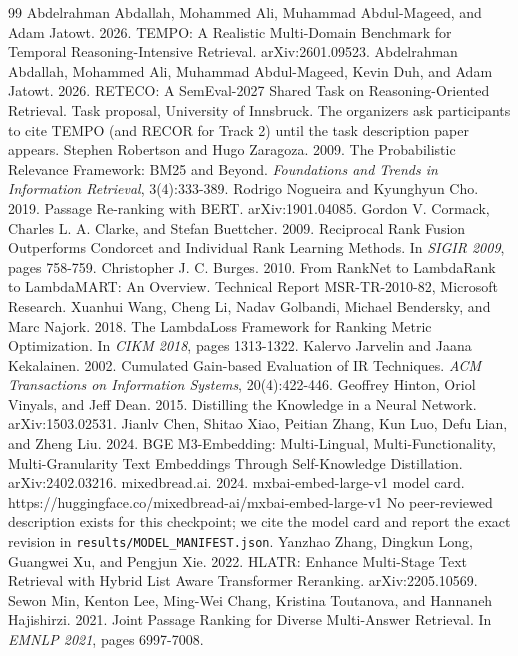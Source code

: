 \documentclass[11pt]{article}
\begin{document}
\begin{thebibliography}{99}
\small
{} Abdelrahman Abdallah, Mohammed Ali, Muhammad Abdul-Mageed, and Adam Jatowt. 2026. TEMPO: A Realistic Multi-Domain Benchmark for Temporal Reasoning-Intensive Retrieval. arXiv:2601.09523.
 Abdelrahman Abdallah, Mohammed Ali, Muhammad Abdul-Mageed, Kevin Duh, and Adam Jatowt. 2026. RETECO: A SemEval-2027 Shared Task on Reasoning-Oriented Retrieval. Task proposal, University of Innsbruck. The organizers ask participants to cite TEMPO (and RECOR for Track 2) until the task description paper appears.
 Stephen Robertson and Hugo Zaragoza. 2009. The Probabilistic Relevance Framework: BM25 and Beyond. \emph{Foundations and Trends in Information Retrieval}, 3(4):333-389.
 Rodrigo Nogueira and Kyunghyun Cho. 2019. Passage Re-ranking with BERT. arXiv:1901.04085.
 Gordon V. Cormack, Charles L. A. Clarke, and Stefan Buettcher. 2009. Reciprocal Rank Fusion Outperforms Condorcet and Individual Rank Learning Methods. In \emph{SIGIR 2009}, pages 758-759.
 Christopher J. C. Burges. 2010. From RankNet to LambdaRank to LambdaMART: An Overview. Technical Report MSR-TR-2010-82, Microsoft Research.
 Xuanhui Wang, Cheng Li, Nadav Golbandi, Michael Bendersky, and Marc Najork. 2018. The LambdaLoss Framework for Ranking Metric Optimization. In \emph{CIKM 2018}, pages 1313-1322.
 Kalervo Jarvelin and Jaana Kekalainen. 2002. Cumulated Gain-based Evaluation of IR Techniques. \emph{ACM Transactions on Information Systems}, 20(4):422-446.
 Geoffrey Hinton, Oriol Vinyals, and Jeff Dean. 2015. Distilling the Knowledge in a Neural Network. arXiv:1503.02531.
 Jianlv Chen, Shitao Xiao, Peitian Zhang, Kun Luo, Defu Lian, and Zheng Liu. 2024. BGE M3-Embedding: Multi-Lingual, Multi-Functionality, Multi-Granularity Text Embeddings Through Self-Knowledge Distillation. arXiv:2402.03216.
 mixedbread.ai. 2024. mxbai-embed-large-v1 model card. https://huggingface.co/mixedbread-ai/mxbai-embed-large-v1 No peer-reviewed description exists for this checkpoint; we cite the model card and report the exact revision in \texttt{results/MODEL\_MANIFEST.json}.
 Yanzhao Zhang, Dingkun Long, Guangwei Xu, and Pengjun Xie. 2022. HLATR: Enhance Multi-Stage Text Retrieval with Hybrid List Aware Transformer Reranking. arXiv:2205.10569.
 Sewon Min, Kenton Lee, Ming-Wei Chang, Kristina Toutanova, and Hannaneh Hajishirzi. 2021. Joint Passage Ranking for Diverse Multi-Answer Retrieval. In \emph{EMNLP 2021}, pages 6997-7008.
\end{thebibliography}
\end{document}
